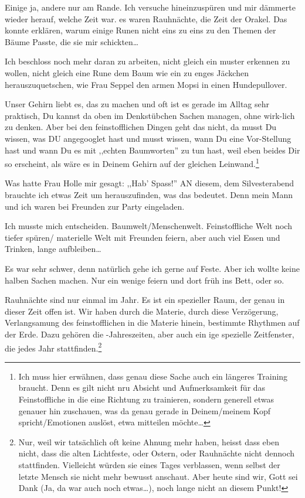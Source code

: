 \documentclass[11pt,titlepage,a5paper]{book}
\begin{document}
Einige ja, andere nur am Rande. Ich versuche hineinzuspüren und mir dämmerte wieder herauf, welche Zeit war. es waren Rauhnächte, die Zeit der Orakel. Das konnte erklären, warum einige Runen nicht eins zu eins zu den Themen der Bäume Passte, die sie mir schickten\dots

Ich beschloss noch mehr daran zu arbeiten, nicht gleich ein muster erkennen zu wollen, nicht gleich eine Rune dem Baum wie ein zu enges Jäckchen herauszuquetschen, wie Frau Seppel den armen Mopsi in einen Hundepullover.

Unser Gehirn liebt es, das zu machen und oft ist es gerade im Alltag sehr praktisch, Du kannst da oben im Denkstübchen Sachen managen, ohne wirk-lich zu denken. Aber bei den feinstofflichen Dingen geht das nicht, da musst Du wissen, was DU angegooglet hast und musst wissen, wann Du eine Vor-Stellung hast und wann Du es mit ,,echten Baumworten'' zu tun hast, weil eben beides Dir so erscheint, als wäre es in Deinem Gehirn auf der gleichen Leinwand.\footnote{Ich muss hier erwähnen, dass genau diese Sache auch ein längeres Training braucht. Denn es gilt nicht nru Absicht und Aufmerksamkeit für das Feinstoffliche in die eine Richtung zu trainieren, sondern generell etwas genauer hin zuschauen, was da genau gerade in Deinem/meinem Kopf spricht/Emotionen auslöst, etwa mitteilen möchte\dots} 

Was hatte Frau Holle mir gesagt: ,,Hab' Spass!'' AN diesem, dem Silvesterabend brauchte ich etwas Zeit um herauszufinden, was das bedeutet. Denn mein Mann und ich waren bei Freunden zur Party eingeladen. 

Ich musste mich entscheiden. Baumwelt/Menschenwelt. Feinstoffliche Welt noch tiefer spüren/ materielle Welt mit Freunden feiern, aber auch viel Essen und Trinken, lange aufbleiben\dots

Es war sehr schwer, denn natürlich gehe ich gerne auf Feste. Aber ich wollte keine halben Sachen machen. Nur ein wenige feiern und dort früh ins Bett, oder so.

Rauhnächte sind nur einmal im Jahr. Es ist ein spezieller Raum, der genau in dieser Zeit offen ist. Wir haben durch die Materie, durch diese Verzögerung, Verlangsamung des feinstofflichen in die Materie hinein, bestimmte Rhythmen auf der Erde. Dazu gehören die -Jahreszeiten, aber auch ein ige spezielle Zeitfenster, die jedes Jahr stattfinden.\footnote{Nur, weil wir tatsächlich oft keine Ahnung mehr haben, heisst dass eben nicht, dass die alten Lichtfeste, oder Ostern, oder Rauhnächte nicht dennoch stattfinden. Vielleicht würden sie eines Tages verblassen, wenn selbst der letzte Mensch sie nicht mehr bewusst anschaut. Aber heute sind wir, Gott sei Dank (Ja, da war auch noch etwas\dots ), noch lange nicht an diesem Punkt!}
\end{document}
